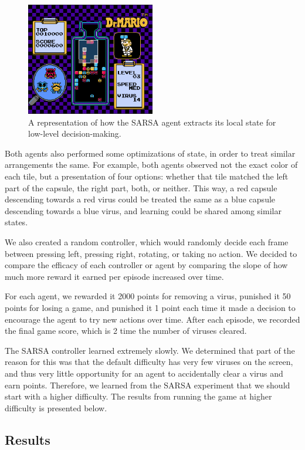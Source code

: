 \documentclass[letterpaper]{article} %
\begin{document}
\begin{figure}
\includegraphics[width=0.5\textwidth]{local-state.png}
\caption{A representation of how the SARSA agent extracts its local state for low-level decision-making.}\label{fig:local-state}
\end{figure}

Both agents also performed some optimizations of state, in order to treat similar arrangements the same. For example, both agents observed not the exact color of each tile, but a presentation of four options: whether that tile matched the left part of the capsule, the right part, both, or neither. This way, a red capsule descending towards a red virus could be treated the same as a blue capsule descending towards a blue virus, and learning could be shared among similar states.

We also created a random controller, which would randomly decide each frame between pressing left, pressing right, rotating, or taking no action. We decided to compare the efficacy of each controller or agent by comparing the slope of how much more reward it earned per episode increased over time.

For each agent, we rewarded it 2000 points for removing a virus, punished it 50 points for losing a game, and punished it 1 point each time it made a decision to encourage the agent to try new actions over time. After each episode, we recorded the final game score, which is 2 time the number of viruses cleared.

The SARSA controller learned extremely slowly. We determined that part of the reason for this was that the default difficulty has very few viruses on the screen, and thus very little opportunity for an agent to accidentally clear a virus and earn points. Therefore, we learned from the SARSA experiment that we should start with a higher difficulty. The results from running the game at higher difficulty is presented below.

\subsection{Results}
\end{document}
